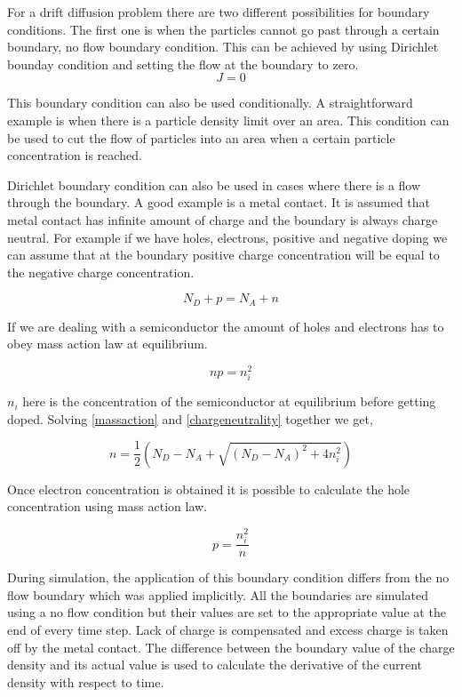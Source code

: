 For a drift diffusion problem there are two different possibilities for boundary conditions. The first one is when the particles cannot go past through a certain boundary, no flow boundary condition. This can be achieved by using Dirichlet bounday condition and setting the flow at the boundary to zero. 
\begin{equation}
J=0
\end{equation}

This boundary condition can also be used conditionally. A straightforward example is when there is a particle density limit over an area. This condition can be used to cut the flow of particles into an area when a certain particle concentration is reached. 

Dirichlet boundary condition can also be used in cases where there is a flow through the boundary. A good example is a metal contact. It is assumed that metal contact has infinite amount of charge and the boundary is always charge neutral. For example if we have holes, electrons, positive and negative doping we can assume that at the boundary positive charge concentration will be equal to the negative charge concentration. 

\begin{equation}
N_{D} + p=N_{A} + n
\label{chargeneutrality}
\end{equation}

If we are dealing with a semiconductor the amount of holes and electrons has to obey mass action law at equilibrium.

\begin{equation}
np=n_i^2
\label{massaction}
\end{equation}

$n_i$ here is the concentration of the semiconductor at equilibrium before getting doped. Solving \eqref{massaction} and \eqref{chargeneutrality} together we get,

\begin{equation}
n=\frac{1}{2}(N_D - N_A + \sqrt{(N_D - N_A)^2+4n_i^2})
\label{nbound}
\end{equation}

Once electron concentration is obtained it is possible to calculate the hole concentration using mass action law.

\begin{equation}
p=\frac{n_i^2}{n}
\label{pbound}
\end{equation}


During simulation, the application of this boundary condition differs from the no flow boundary which was applied implicitly. All the boundaries are simulated using a no flow condition but their values are set to the appropriate value at the end of every time step. Lack of charge is compensated and excess charge is taken off by the metal contact. The difference between the boundary value of the charge density and its actual value is used to calculate the derivative of the current density with respect to time.

